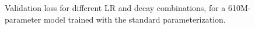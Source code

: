 \begin{figure}
  \centering
  \mbox{}
  \vspace{-4mm}
  \mbox{}
  \caption{Validation loss for different LR and decay combinations,
    for a 610M-parameter model trained with the standard
    parameterization.\label{fig:maxlr_sp.heatmap}}
\end{figure}
